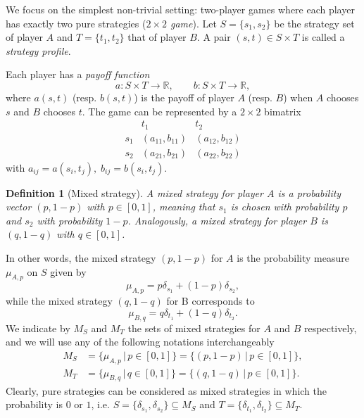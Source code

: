 \documentclass[11pt,a4paper,twoside]{article}
\newtheorem{definition}{Definition}
\begin{document}
We focus on the simplest non-trivial setting: two-player games where each player has exactly two pure  strategies (\emph{$2\times 2$ game}).  
Let \(S=\{s_1,s_2\}\) be the strategy set of player \(A\) and \(T=\{t_1,t_2\}\) that of player \(B\).  
A pair \((s,t)\in S\times T\) is called a \emph{strategy profile}.

Each player has a \emph{payoff function}
\[
a:S\times T\to\mathbb{R},\qquad b:S\times T\to\mathbb{R},
\]
where \(a(s,t)\) (resp. \(b(s,t)\)) is the payoff of player \(A\) (resp. \(B\)) when \(A\) chooses \(s\) and \(B\) chooses \(t\).  
The game can be represented by a \(2\times2\) bimatrix
\[
\begin{array}{c|cc}
& t_1 & t_2 \\ \hline
s_1 & (a_{11},b_{11}) & (a_{12},b_{12})\\
s_2 & (a_{21},b_{21}) & (a_{22},b_{22})
\end{array}
\]
with \(a_{ij}=a(s_i,t_j),\; b_{ij}=b(s_i,t_j)\).

\begin{definition}[Mixed strategy]
A \emph{mixed strategy} for player \(A\) is a probability vector \((p,1-p)\) with \(p\in[0,1]\), meaning that \(s_1\) is chosen with probability \(p\) and \(s_2\) with probability \(1-p\).  
Analogously, a mixed strategy for player \(B\) is \((q,1-q)\) with \(q\in[0,1]\).
\end{definition}
In other words, the mixed strategy $(p,1-p)$ for $A$ is the probability measure $\mu_{A,p}$ on $S$ given by 
$$\mu_{A,p}=p\delta_{s_1}+(1-p)\delta_{s_2},$$ 
while the mixed strategy $(q,1-q)$ for B corresponds to 
$$\mu_{B,q}=q\delta_{t_1}+(1-q)\delta_{t_2}.$$
We indicate by $M_S$ and $M_T$ the sets of mixed strategies for $A$ and $B$ respectively, and we will use any of the following notations interchangeably
\begin{align*}
    M_S&=\{\mu_{A,p}\,|\, p\in[0,1]\}=\{(p,1-p)\,|\,p\in[0,1]\},\\ M_T&=\{\mu_{B,q}\,|\, q\in[0,1]\}=\{(q,1-q)\,|\,p\in[0,1]\}.
\end{align*}
Clearly, pure strategies can be considered as mixed strategies in which the probability is $0$ or $1$, i.e. $S=\{\delta_{s_1}, \delta_{s_2}\}\subseteq M_S$ and $T=\{\delta_{t_1},\delta_{t_2}\}\subseteq M_T$.
\end{document}
